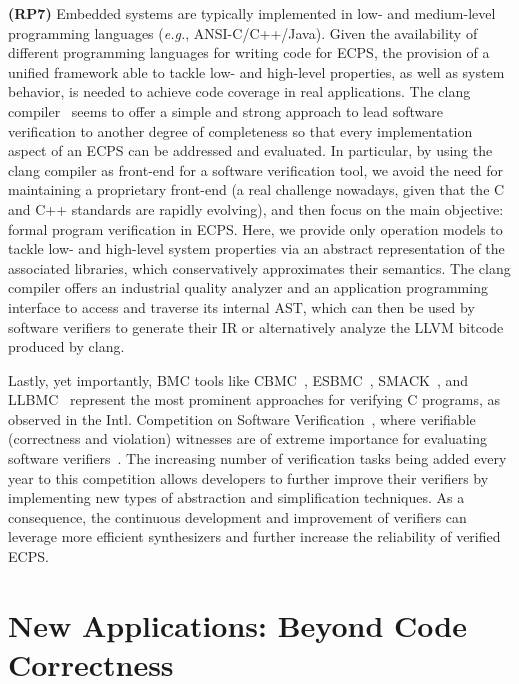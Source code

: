 \documentclass{cta-author}
\begin{document}
{{		\textbf{(RP7)} Embedded systems are typically implemented in low- and medium-level programming languages ({\it e.g.}, ANSI-C/C++/Java). Given the availability of different programming languages for writing code for ECPS, the provision of a unified framework able to tackle low- and high-level properties, as well as system behavior, is needed to achieve code coverage in real applications. The clang compiler~\cite{Lopes:2014:GSL:2692607} seems to offer a simple and strong approach to lead software verification to another degree of completeness so that every implementation aspect of an ECPS can be addressed and evaluated. In particular, by using the clang compiler as front-end for a software verification tool, we avoid the need for maintaining a proprietary front-end (a real challenge nowadays, given that the C and C++ standards are rapidly evolving), and then focus on the main objective: formal program verification in ECPS. Here, we provide only operation models to tackle low- and high-level system properties via an abstract representation of the associated libraries, which conservatively approximates their semantics. The clang compiler offers an industrial quality analyzer and an application programming interface to access and traverse its internal AST, which can then be used by software verifiers to generate their IR or alternatively analyze the LLVM bitcode produced by clang. 
		
		Lastly, yet importantly, BMC tools like CBMC~\cite{Clarke04}, ESBMC~\cite{MorseCNF13,MorseRCN014}, SMACK~\cite{Haran15}, and LLBMC~\cite{MerzFS12} represent the most prominent approaches for verifying C programs, as observed in the Intl. Competition on Software Verification~\cite{Beyer14,BeyerSVCOMP15,Beyer16}, where verifiable (correctness and violation) witnesses are of extreme importance for evaluating software verifiers~\cite{BeyerW15,RochaIFM12}. The increasing number of verification tasks being added every year to this competition allows developers to further improve their verifiers by implementing new types of abstraction and simplification techniques. As a consequence, the continuous development and improvement of verifiers can leverage more efficient synthesizers and further increase the reliability of verified ECPS.
		
		\section{New Applications: Beyond Code Correctness}
		\label{Newapp}
		
}}
\end{document}
